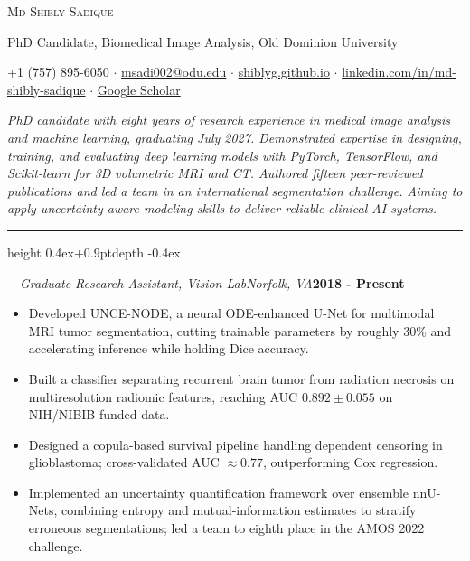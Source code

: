 \documentclass[10pt,letterpaper]{article}
\newcommand{\spaced}[1]{\lsstyle #1}
\newcommand{\rsection}[1]{%
  \vspace{4.5pt}%
  \noindent{\scshape\spaced{#1}}\hspace{6pt}%
  {\leaders\hrule height \dimexpr0.4ex+0.9pt\relax depth -0.4ex\hfill}\kern0pt%
  \par\vspace{6pt}}
\newcommand{\job}[4]{%
  \noindent{\scshape #1} \,-\, \textit{#2}\hfill{\textit{#3}\quad\textbf{#4}}\par\vspace{1pt}}
\begin{document}
\begin{center}
{\LARGE\scshape\spaced{Md Shibly Sadique}}\par\vspace{2pt}
PhD Candidate, Biomedical Image Analysis, Old Dominion University\par\vspace{2pt}
{\small +1 (757) 895-6050 \;$\cdot$\;
\href{mailto:msadi002@odu.edu}{msadi002@odu.edu} \;$\cdot$\;
\href{https://shiblyg.github.io}{shiblyg.github.io} \;$\cdot$\;
\href{https://www.linkedin.com/in/md-shibly-sadique-277b891a5/}{linkedin.com/in/md-shibly-sadique} \;$\cdot$\;
\href{https://scholar.google.com/citations?user=EWnmhbgAAAAJ&hl=en}{Google Scholar}}
\end{center}

\vspace{7pt}

\textit{PhD candidate with eight years of research experience in medical image analysis and machine learning, graduating July
2027. Demonstrated expertise in designing, training, and evaluating deep learning models with PyTorch, TensorFlow, and
Scikit-learn for 3D volumetric MRI and CT. Authored fifteen peer-reviewed publications and led a team in an international
segmentation challenge. Aiming to apply uncertainty-aware modeling skills to deliver reliable clinical AI systems.}

\vspace{3pt}

\rsection{Experience}

\job{Old Dominion University}{Graduate Research Assistant, Vision Lab}{Norfolk, VA}{2018 - Present}
\begin{itemize}
\item Developed UNCE-NODE, a neural ODE-enhanced U-Net for multimodal MRI tumor segmentation, cutting trainable parameters by roughly 30\% and accelerating inference while holding Dice accuracy.
\item Built a classifier separating recurrent brain tumor from radiation necrosis on multiresolution radiomic features, reaching AUC $0.892 \pm 0.055$ on NIH/NIBIB-funded data.
\item Designed a copula-based survival pipeline handling dependent censoring in glioblastoma; cross-validated AUC $\approx 0.77$, outperforming Cox regression.
\item Implemented an uncertainty quantification framework over ensemble nnU-Nets, combining entropy and mutual-information estimates to stratify erroneous segmentations; led a team to eighth place in the AMOS 2022 challenge.
\end{itemize}
\end{document}
